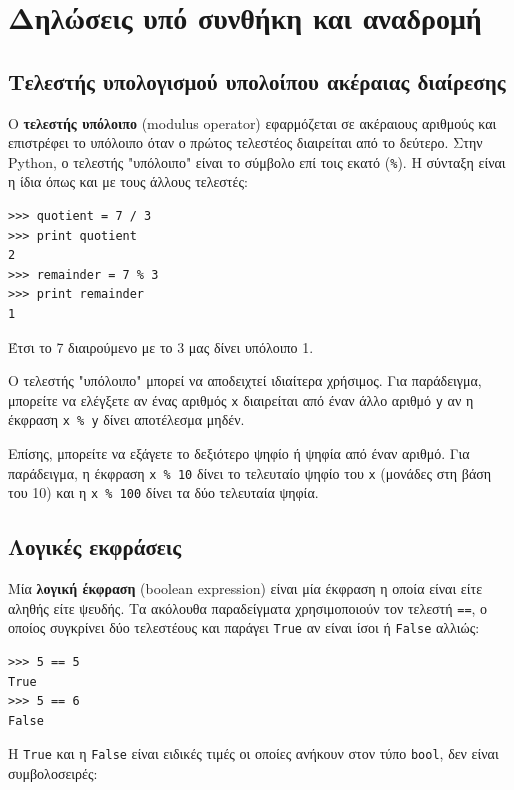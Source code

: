 \documentclass[10pt]{book}
\begin{document}
\chapter{Δηλώσεις υπό συνθήκη και αναδρομή}

\section{Τελεστής υπολογισμού υπολοίπου ακέραιας διαίρεσης}

Ο {\bf τελεστής υπόλοιπο} (modulus operator) εφαρμόζεται σε ακέραιους αριθμούς και επιστρέφει το υπόλοιπο όταν ο πρώτος τελεστέος διαιρείται από το δεύτερο. Στην Python, ο τελεστής  "υπόλοιπο" είναι το σύμβολο επί τοις εκατό (\verb"%").  Η σύνταξη είναι η ίδια όπως και με τους άλλους τελεστές:

\begin{verbatim}
>>> quotient = 7 / 3
>>> print quotient
2
>>> remainder = 7 % 3
>>> print remainder
1
\end{verbatim}
%

Έτσι το 7 διαιρούμενο με το 3 μας δίνει υπόλοιπο 1.

Ο τελεστής "υπόλοιπο" μπορεί να αποδειχτεί ιδιαίτερα χρήσιμος. Για παράδειγμα, μπορείτε να ελέγξετε αν ένας αριθμός {\tt x} διαιρείται από έναν άλλο αριθμό {\tt y} αν η έκφραση {\tt x \% y} δίνει αποτέλεσμα μηδέν.


Επίσης, μπορείτε να εξάγετε το δεξιότερο ψηφίο ή ψηφία από έναν αριθμό. Για παράδειγμα, η έκφραση {\tt x \% 10} δίνει το τελευταίο ψηφίο του {\tt x} (μονάδες στη βάση του 10) και η {\tt x \% 100} δίνει τα δύο
τελευταία ψηφία.


\section{Λογικές εκφράσεις}

Μία {\bf λογική έκφραση} (boolean expression) είναι μία έκφραση η οποία είναι είτε αληθής είτε ψευδής. Τα ακόλουθα παραδείγματα χρησιμοποιούν τον τελεστή {\tt ==}, ο οποίος συγκρίνει δύο τελεστέους και παράγει  {\tt True} αν είναι ίσοι ή {\tt False} αλλιώς:

\begin{verbatim}
>>> 5 == 5
True
>>> 5 == 6
False
\end{verbatim}
%

Η  {\tt True}  και η  {\tt False}  είναι ειδικές τιμές οι οποίες ανήκουν στον τύπο {\tt bool},  δεν είναι συμβολοσειρές:
\end{document}
